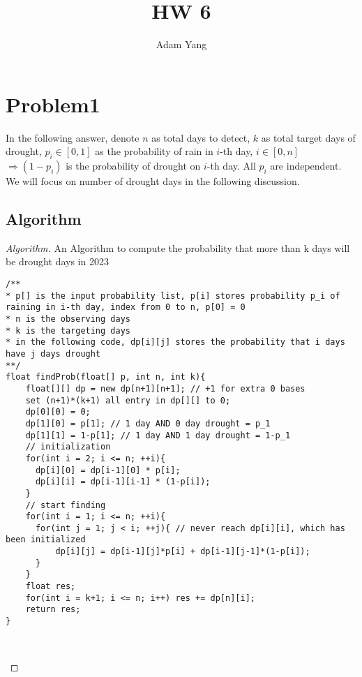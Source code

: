 \documentclass[openany]{article}
\begin{document}
\title{HW 6}
\author{Adam Yang}
\maketitle




\section*{Problem1}

In the following answer, denote $n$ as total days to detect, $k$ as total target days of drought, $p_i\in [0,1]$ as the probability of rain in $i$-th day, $i\in [0,n]$ $\Rightarrow (1-p_i)$ is the probability of drought on $i$-th day. All $p_i$ are independent. We will focus on number of drought days in the following discussion.

\subsection*{Algorithm}
\begin{proof}[Algorithm]{}
		\renewcommand{\qedsymbol}{}
		An Algorithm to compute the probability that more than k days will be drought days in 2023
		\begin{lstlisting}[basicstyle=\fontsize{8}{9}\selectfont\ttfamily]
/**
* p[] is the input probability list, p[i] stores probability p_i of raining in i-th day, index from 0 to n, p[0] = 0
* n is the observing days
* k is the targeting days
* in the following code, dp[i][j] stores the probability that i days have j days drought
**/
float findProb(float[] p, int n, int k){
	float[][] dp = new dp[n+1][n+1]; // +1 for extra 0 bases
    set (n+1)*(k+1) all entry in dp[][] to 0;
    dp[0][0] = 0;
    dp[1][0] = p[1]; // 1 day AND 0 day drought = p_1
    dp[1][1] = 1-p[1]; // 1 day AND 1 day drought = 1-p_1
    // initialization
    for(int i = 2; i <= n; ++i){
      dp[i][0] = dp[i-1][0] * p[i];
      dp[i][i] = dp[i-1][i-1] * (1-p[i]);
    }
    // start finding
    for(int i = 1; i <= n; ++i){
      for(int j = 1; j < i; ++j){ // never reach dp[i][i], which has been initialized
          dp[i][j] = dp[i-1][j]*p[i] + dp[i-1][j-1]*(1-p[i]);
      }
    }
    float res;
    for(int i = k+1; i <= n; i++) res += dp[n][i];
    return res;
}

        
		\end{lstlisting} 
\end{proof}
\end{document}

